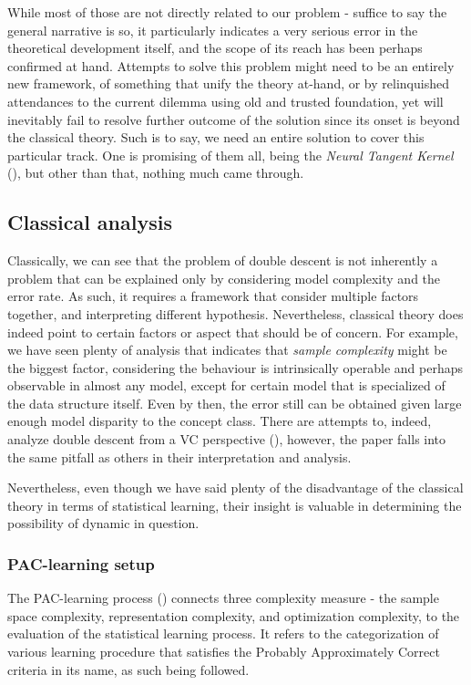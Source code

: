 \documentclass[10pt]{article} %
\begin{document}
While most of those are not directly related to our problem - suffice to say the general narrative is so, it particularly indicates a very serious error in the theoretical development itself, and the scope of its reach has been perhaps confirmed at hand. Attempts to solve this problem might need to be an entirely new framework, of something that unify the theory at-hand, or by relinquished attendances to the current dilemma using old and trusted foundation, yet will inevitably fail to resolve further outcome of the solution since its onset is beyond the classical theory. Such is to say, we need an entire solution to cover this particular track. One is promising of them all, being the \textit{Neural Tangent Kernel} (\cite{Jacot:2018:NTK}), but other than that, nothing much came through. 


\subsection{Classical analysis}

Classically, we can see that the problem of double descent is not inherently a problem that can be explained only by considering model complexity and the error rate. As such, it requires a framework that consider multiple factors together, and interpreting different hypothesis. Nevertheless, classical theory does indeed point to certain factors or aspect that should be of concern. For example, we have seen plenty of analysis that indicates that \textit{sample complexity} might be the biggest factor, considering the behaviour is intrinsically operable and perhaps observable in almost any model, except for certain model that is specialized of the data structure itself. Even by then, the error still can be obtained given large enough model disparity to the concept class. There are attempts to, indeed, analyze double descent from a VC perspective (\cite{lee2022vctheoreticalexplanationdouble}), however, the paper falls into the same pitfall as others in their interpretation and analysis. 

Nevertheless, even though we have said plenty of the disadvantage of the classical theory in terms of statistical learning, their insight is valuable in determining the possibility of dynamic in question. 

\subsubsection{PAC-learning setup}

The PAC-learning process (\cite{10.5555/2621980,10.5555/2371238,STL_Hajek_Maxim_2021}) connects three complexity measure - the sample space complexity, representation complexity, and optimization complexity, to the evaluation of the statistical learning process. It refers to the categorization of various learning procedure that satisfies the Probably Approximately Correct criteria in its name, as such being followed. 
\end{document}
